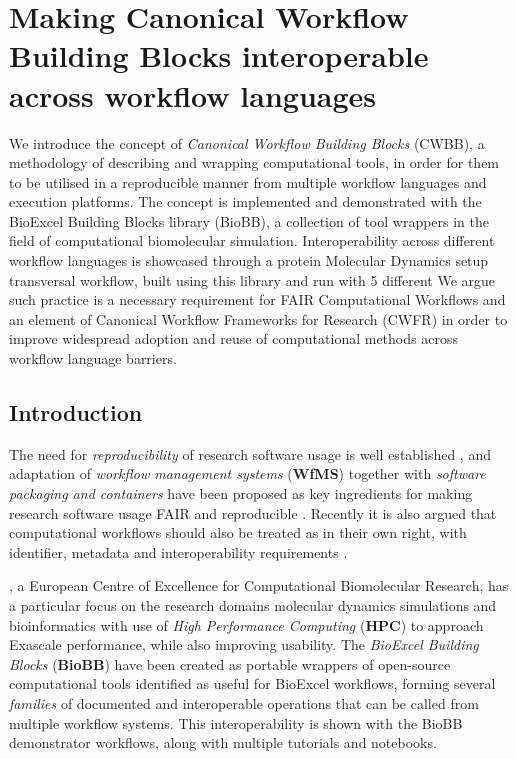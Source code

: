 \section{Making Canonical Workflow Building Blocks interoperable across
workflow
languages}
\label{ch6:making-canonical-workflow-building-blocks-interoperable-across-workflow-languages}

We introduce the concept of \emph{Canonical Workflow Building Blocks} (CWBB), a methodology of describing and wrapping computational tools, in order for them to be utilised in a reproducible manner from multiple workflow languages and execution platforms.
The concept is implemented and demonstrated with the BioExcel Building Blocks library (BioBB), a collection of tool wrappers in the field of computational biomolecular simulation.
Interoperability across different workflow languages is showcased through a protein Molecular Dynamics setup transversal workflow, built using this library and run with 5 different 
We argue such practice is a necessary requirement for FAIR Computational Workflows and an element of Canonical Workflow Frameworks for Research (CWFR) in order to improve widespread adoption and reuse of computational methods across workflow language barriers.

\subsection{Introduction}\label{ch6:introduction}

The need for \emph{reproducibility} of research software usage is well established \cite{Stodden 2016,Leipzig 2021,Katz 2021a}, and adaptation of \emph{workflow management systems} (\textbf{WfMS}) together with \emph{software packaging and containers} \cite{Möller 2017} have been proposed as key ingredients for making research software usage \acrshort{FAIR} and reproducible \cite{Cohen-Boulakia 2017,Grüning 2018b,Lamprecht 2019}.
Recently it is also argued that computational workflows should also be treated as  \cite{De Smedt 2020} in their own right, with identifier, metadata \cite{Leipzig 2021} and interoperability requirements \cite{Goble 2020}.

, a European Centre of Excellence for Computational Biomolecular Research, has a particular focus on the research domains molecular dynamics simulations and bioinformatics with use of \emph{High Performance Computing} (\textbf{HPC}) to approach Exascale performance, while also improving usability.
The \emph{BioExcel Building Blocks} (\textbf{BioBB}) \cite{Andrio 2019} have been created as portable wrappers of open-source computational tools identified as useful for BioExcel workflows, forming several \emph{families} of documented and interoperable operations that can be called from multiple workflow systems.
This interoperability is shown with the BioBB demonstrator workflows, along with multiple tutorials and notebooks.

